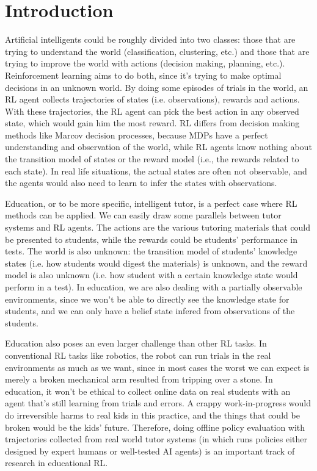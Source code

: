 \section{Introduction}

Artificial intelligents could be roughly divided into two classes: those that are trying to understand the world (classification, clustering, etc.) and those that are trying to improve the world with actions (decision making, planning, etc.). Reinforcement learning aims to do both, since it's trying to make optimal decisions in an unknown world. By doing some episodes of trials in the world, an RL agent collects trajectories of states (i.e. observations), rewards and actions. With these trajectories, the RL agent can pick the best action in any observed state, which would gain him the most reward. RL differs from decision making methods like Marcov decision processes, because MDPs have a perfect understanding and observation of the world, while RL agents know nothing about the transition model of states or the reward model (i.e., the rewards related to each state). In real life situations, the actual states are often not observable, and the agents would also need to learn to infer the states with observations.

Education, or to be more specific, intelligent tutor, is a perfect case where RL methods can be applied. We can easily draw some parallels between tutor systems and RL agents. The actions are the various tutoring materials that could be presented to students, while the rewards could be students' performance in tests. The world is also unknown: the transition model of students' knowledge states (i.e. how students would digest the materials) is unknown, and the reward model is also unknown (i.e. how student with a certain knowledge state would perform in a test). In education, we are also dealing with a partially observable environments, since we won't be able to directly see the knowledge state for students, and we can only have a belief state infered from observations of the students.

Education also poses an even larger challenge than other RL tasks. In conventional RL tasks like robotics, the robot can run trials in the real environments as much as we want, since in most cases the worst we can expect is merely a broken mechanical arm resulted from tripping over a stone. In education, it won't be ethical to collect online data on real students with an agent that's still learning from trials and errors. A crappy work-in-progress would do irreversible harms to real kids in this practice, and the things that could be broken would be the kids' future. Therefore, doing offline policy evaluation with trajectories collected from real world tutor systems (in which runs policies either designed by expert humans or well-tested AI agents) is an important track of research in educational RL.

